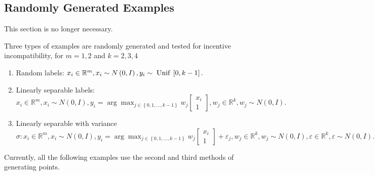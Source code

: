\documentclass{article}
\begin{document}
\subsection{Randomly Generated Examples}
\begin{tcolorbox}[colback = white]
This section is no longer necessary.
\end{tcolorbox}
Three types of examples are randomly generated and tested for incentive incompatibility, for $m  = 1, 2$ and $k  = 2, 3, 4$
\begin{enumerate}
\item Random labels: $x_{i} \in \mathbb{R}^{m}, x_{i} \sim  N\left(0, I\right), y_{i} \sim  \text{\;Unif\;} \left[0, k - 1\right].$
\item Linearly separable labels: $x_{i} \in \mathbb{R}^{m}, x_{i} \sim  N\left(0, I\right), y_{i} = \arg\displaystyle\max_{j \in \left\{0, 1, ..., k -1\right\}} w_{j} \begin{bmatrix} x_{i} \\ 1 \end{bmatrix} , w_{j} \in \mathbb{R}^{k}, w_{j} \sim  N\left(0, I\right).$
\item Linearly separable with variance $\sigma: x_{i} \in \mathbb{R}^{m}, x_{i} \sim  N\left(0, I\right), y_{i} = \arg\displaystyle\max_{j \in \left\{0, 1, ..., k -1\right\}} w_{j} \begin{bmatrix} x_{i} \\ 1 \end{bmatrix} + \varepsilon_{j} , w_{j} \in \mathbb{R}^{k}, w_{j} \sim  N\left(0, I\right), \varepsilon \in \mathbb{R}^{k}, \varepsilon \sim  N\left(0, I\right).$
\end{enumerate}

Currently, all the following examples use the second and third methods of generating points.
\newline \newline
\end{document}
